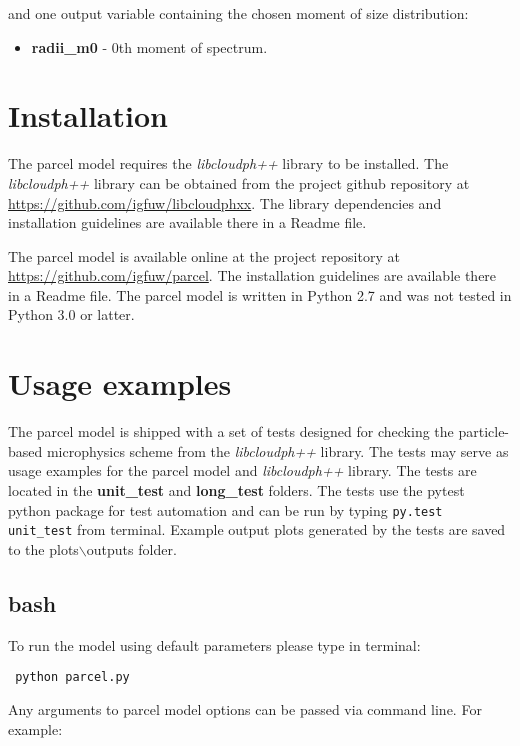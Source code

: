 \documentclass[11pt]{article}
\newcommand{\prog}[1]{{\tt#1}}
\begin{document}
and one output variable containing the chosen  moment of size distribution:
\begin{itemize}
  \item \textbf{radii\_m0} - 0th moment of spectrum.
\end{itemize}

\section{Installation}

The parcel model requires the \emph{libcloudph++} library to be installed. 
The \emph{libcloudph++} library can be obtained from the project github repository 
  at \url{https://github.com/igfuw/libcloudphxx}.
The library dependencies and installation guidelines are available there in a Readme file.

The parcel model is available online at the project repository at \url{https://github.com/igfuw/parcel}.
The installation guidelines are available there in a Readme file.
The parcel model is written in Python 2.7 and was not tested in Python 3.0 or latter.

\section{Usage examples}

The parcel model is shipped with a set of tests designed for checking the particle-based microphysics scheme
  from the \emph{libcloudph++} library.
The tests may serve as usage examples for the parcel model and \emph{libcloudph++} library.
The tests are located in the {\bf unit\_test} and {\bf long\_test} folders.
The tests use the pytest python package for test automation and can be run by typing  \prog{py.test unit\_test} 
  from terminal.
Example output plots generated by the tests are saved to the plots$\backslash$outputs folder.

\subsection{bash}

\noindent
To run the model using default parameters please type in terminal:

\vspace{0.35cm}
  \prog{ python parcel.py}
\vspace{0.35cm}

\noindent
Any arguments to parcel model options can be passed via command line. For example:
\end{document}
